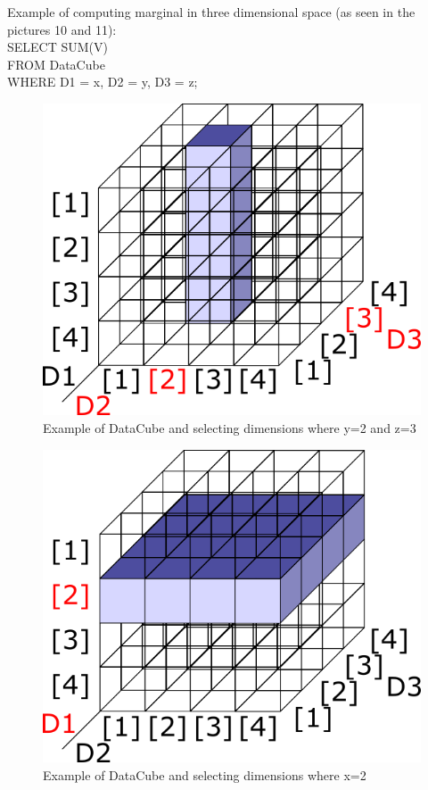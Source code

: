 Example of computing marginal in three dimensional space (as seen in the pictures 10 and 11):\\
SELECT SUM(V) \\
FROM DataCube \\
WHERE D1 = x, D2 = y, D3 = z;\\
\begin{figure}
\centering
\includegraphics[scale=0.5]{marg1d.png}
\caption{Example of DataCube and selecting dimensions where y=2 and z=3}
\end{figure}
\begin{figure}
\centering
\includegraphics[scale=0.5]{marg2d.png}
\caption{Example of DataCube and selecting dimensions where x=2}
\end{figure}

